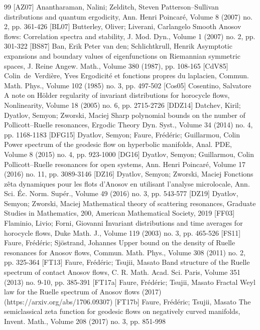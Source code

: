 \begin{thebibliography}{99}
 [AZ07] Anantharaman, Nalini; Zelditch, Steven Patterson–Sullivan distributions and quantum ergodicity, Ann. Henri Poincaré, Volume 8 (2007) no. 2, pp. 361-426
 [BL07] Butterley, Oliver; Liverani, Carlangelo Smooth Anosov flows: Correlation spectra and stability, J. Mod. Dyn., Volume 1 (2007) no. 2, pp. 301-322
 [BS87] Ban, Erik Peter van den; Schlichtkrull, Henrik Asymptotic expansions and boundary values of eigenfunctions on Riemannian symmetric spaces, J. Reine Angew. Math., Volume 380 (1987), pp. 108-165
 [CdV85] Colin de Verdière, Yves Ergodicité et fonctions propres du laplacien, Commun. Math. Phys., Volume 102 (1985) no. 3, pp. 497-502
 [Cos05] Cosentino, Salvatore A note on Hölder regularity of invariant distributions for horocycle flows, Nonlinearity, Volume 18 (2005) no. 6, pp. 2715-2726
 [DDZ14] Datchev, Kiril; Dyatlov, Semyon; Zworski, Maciej Sharp polynomial bounds on the number of Pollicott–Ruelle resonances, Ergodic Theory Dyn. Syst., Volume 34 (2014) no. 4, pp. 1168-1183
 [DFG15] Dyatlov, Semyon; Faure, Frédéric; Guillarmou, Colin Power spectrum of the geodesic flow on hyperbolic manifolds, Anal. PDE, Volume 8 (2015) no. 4, pp. 923-1000
 [DG16] Dyatlov, Semyon; Guillarmou, Colin Pollicott–Ruelle resonances for open systems, Ann. Henri Poincaré, Volume 17 (2016) no. 11, pp. 3089-3146
 [DZ16] Dyatlov, Semyon; Zworski, Maciej Fonctions zêta dynamiques pour les flots d’Anosov en utilisant l’analyse microlocale, Ann. Sci. Éc. Norm. Supér., Volume 49 (2016) no. 3, pp. 543-577
 [DZ19] Dyatlov, Semyon; Zworski, Maciej Mathematical theory of scattering resonances, Graduate Studies in Mathematics, 200, American Mathematical Society, 2019
 [FF03] Flaminio, Livio; Forni, Giovanni Invariant distributions and time averages for horocycle flows, Duke Math. J., Volume 119 (2003) no. 3, pp. 465-526
 [FS11] Faure, Frédéric; Sjöstrand, Johannes Upper bound on the density of Ruelle resonances for Anosov flows, Commun. Math. Phys., Volume 308 (2011) no. 2, pp. 325-364
 [FT13] Faure, Frédéric; Tsujii, Masato Band structure of the Ruelle spectrum of contact Anosov flows, C. R. Math. Acad. Sci. Paris, Volume 351 (2013) no. 9-10, pp. 385-391
 [FT17a] Faure, Frédéric; Tsujii, Masato Fractal Weyl law for the Ruelle spectrum of Anosov flows (2017) (https://arxiv.org/abs/1706.09307)
 [FT17b] Faure, Frédéric; Tsujii, Masato The semiclassical zeta function for geodesic flows on negatively curved manifolds, Invent. Math., Volume 208 (2017) no. 3, pp. 851-998

\end{thebibliography}
